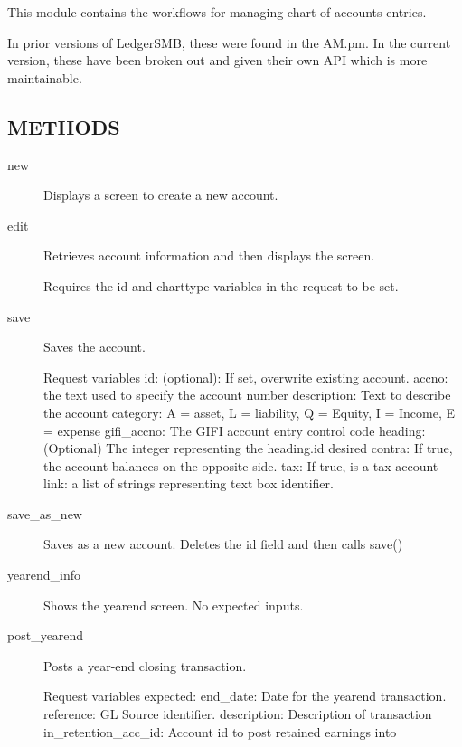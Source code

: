 This module contains the workflows for managing chart of accounts entries.



In prior versions of LedgerSMB, these were found in the AM.pm.  In the current 
version, these have been broken out and given their own API which is more 
maintainable.

\subsection*{METHODS\label{LedgerSMB:Scripts::account_LedgerSMB_workflow_scripts_for_managing_accounts_METHODS}}
\begin{description}

\item[{new}] \mbox{}

Displays a screen to create a new account.


\item[{edit}] \mbox{}

Retrieves account information and then displays the screen.



Requires the id and charttype variables in the request to be set.


\item[{save}] \mbox{}

Saves the account.



Request variables
id: (optional):  If set, overwrite existing account.
accno: the text used to specify the account number
description:  Text to describe the account
category: A = asset, L = liability, Q = Equity, I = Income, E = expense
gifi\_accno:  The GIFI account entry control code
heading: (Optional) The integer representing the heading.id desired 
contra:  If true, the account balances on the opposite side.
tax:  If true, is a tax account
link:  a list of strings representing text box identifier.


\item[{save\_as\_new}] \mbox{}

Saves as a new account.  Deletes the id field and then calls save()


\item[{yearend\_info}] \mbox{}

Shows the yearend screen.  No expected inputs.


\item[{post\_yearend}] \mbox{}

Posts a year-end closing transaction.



Request variables expected:
end\_date: Date for the yearend transaction.  
reference: GL Source identifier.
description: Description of transaction
in\_retention\_acc\_id: Account id to post retained earnings into

\end{description}
